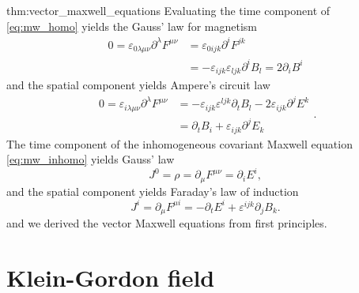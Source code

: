 \begin{delayedproof}{thm:vector_maxwell_equations}
	Evaluating the time component of \cref{eq:mw_homo} yields the Gauss' law for magnetism
	\begin{equation}
		\begin{split}
			0
			=
			\varepsilon_{0\lambda\mu\nu}\partial^\lambda F^{\mu\nu}
			&=
			\varepsilon_{0ijk}\partial^iF^{jk}
			\\
			&=
			-
			\varepsilon_{ijk}\varepsilon_{ljk}
			\partial^i B_l
			=
			2\partial_iB^i
		\end{split}
		\label{eq:mw_gauss_law_mag}
	\end{equation}
	and the spatial component yields Ampere's circuit law
	\begin{equation}
		\begin{split}
			0
			=
			\varepsilon_{i\lambda\mu\nu}
			\partial^\lambda
			F^{\mu\nu}
			&=
			-
			\varepsilon_{ijk}
			\varepsilon^{ljk}
			\partial_t B_l
			-
			2\varepsilon_{ijk}
			\partial^jE^k
			\\
			&=
			\partial_tB_i
			+
			\varepsilon_{ijk}
			\partial^jE_k
		\end{split}
		\label{eq:mw_ampere_law}.
	\end{equation}
	The time component of the inhomogeneous covariant Maxwell equation \cref{eq:mw_inhomo} yields Gauss' law
	\begin{equation}
		J^0
		=
		\rho
		=
		\partial_\mu F^{\mu\nu}
		=
		\partial_i E^i
		\label{eq:mw_gauss_law},
	\end{equation}
	and the spatial component yields Faraday's law of induction
	\begin{equation}
		J^i
		=
		\partial_\mu F^{\mu i}
		=
		-\partial_t E^i
		+\varepsilon^{ijk}\partial_j B_k
		\label{eq:mw_faraday_law}.
	\end{equation}
	and we derived the vector Maxwell equations from first principles.	
\end{delayedproof}

\section{Klein-Gordon field}

